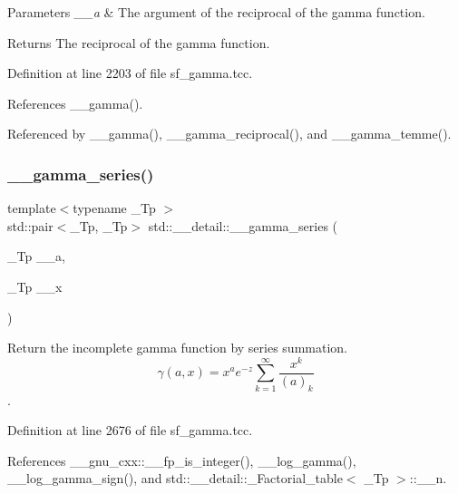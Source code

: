 \begin{DoxyParams}{Parameters}
{\em \+\_\+\+\_\+a} & The argument of the reciprocal of the gamma function. \\
\hline
\end{DoxyParams}
\begin{DoxyReturn}{Returns}
The reciprocal of the gamma function. 
\end{DoxyReturn}


Definition at line 2203 of file sf\+\_\+gamma.\+tcc.



References \+\_\+\+\_\+gamma().



Referenced by \+\_\+\+\_\+gamma(), \+\_\+\+\_\+gamma\+\_\+reciprocal(), and \+\_\+\+\_\+gamma\+\_\+temme().

\mbox{\label{namespacestd_1_1____detail_aa480c595e1c5b894d76398cf0e8eb02b}} 
\subsubsection{\texorpdfstring{\+\_\+\+\_\+gamma\+\_\+series()}{\_\_gamma\_series()}}
{\footnotesize\ttfamily template$<$typename \+\_\+\+Tp $>$ \\
std\+::pair$<$\+\_\+\+Tp, \+\_\+\+Tp$>$ std\+::\+\_\+\+\_\+detail\+::\+\_\+\+\_\+gamma\+\_\+series (\begin{DoxyParamCaption}\item[{\+\_\+\+Tp}]{\+\_\+\+\_\+a,  }\item[{\+\_\+\+Tp}]{\+\_\+\+\_\+x }\end{DoxyParamCaption})}



Return the incomplete gamma function by series summation. \[ \gamma(a,x) = x^a e^{-z}\sum_{k=1}^{\infty} \frac{x^k}{(a)_k} \]. 



Definition at line 2676 of file sf\+\_\+gamma.\+tcc.



References \+\_\+\+\_\+gnu\+\_\+cxx\+::\+\_\+\+\_\+fp\+\_\+is\+\_\+integer(), \+\_\+\+\_\+log\+\_\+gamma(), \+\_\+\+\_\+log\+\_\+gamma\+\_\+sign(), and std\+::\+\_\+\+\_\+detail\+::\+\_\+\+Factorial\+\_\+table$<$ \+\_\+\+Tp $>$\+::\+\_\+\+\_\+n.



